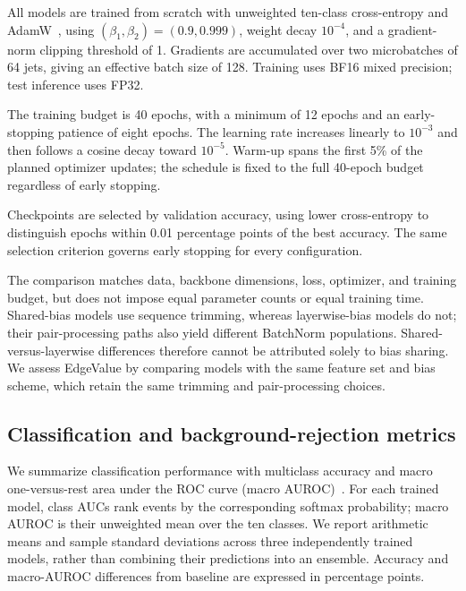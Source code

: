 All models are trained from scratch with unweighted ten-class cross-entropy and
AdamW~\citep{Loshchilov2019AdamW}, using $(\beta_1,\beta_2)=(0.9,0.999)$,
weight decay $10^{-4}$, and a gradient-norm clipping threshold of 1.
Gradients are accumulated over two microbatches of 64 jets, giving an effective
batch size of 128. Training uses BF16 mixed precision; test inference uses FP32.

The training budget is 40 epochs, with a minimum of 12 epochs and an early-stopping
patience of eight epochs. The learning rate increases linearly to $10^{-3}$ and
then follows a cosine decay toward $10^{-5}$. Warm-up spans the first 5\% of
the planned optimizer updates; the schedule is fixed to the full 40-epoch
budget regardless of early stopping.

Checkpoints are selected by validation accuracy, using lower cross-entropy
to distinguish epochs within 0.01 percentage points of the best accuracy.
The same selection criterion governs early stopping for every configuration.

The comparison matches data, backbone dimensions, loss, optimizer, and training
budget, but does not impose equal parameter counts or equal training time.
Shared-bias models use sequence trimming, whereas layerwise-bias models do not;
their pair-processing paths also yield different BatchNorm populations.
Shared-versus-layerwise differences therefore cannot be attributed solely to
bias sharing. We assess EdgeValue by comparing models with the same feature
set and bias scheme, which retain the same trimming and pair-processing choices.

\subsection{Classification and background-rejection metrics}
We summarize classification performance with multiclass accuracy and macro
one-versus-rest area under the ROC curve (macro AUROC)~\citep{Fawcett2006ROC}.
For each trained model, class AUCs rank events by the corresponding softmax
probability; macro AUROC is their unweighted mean over the ten classes.
We report arithmetic means and sample standard deviations across three independently
trained models, rather than combining their predictions into an ensemble.
Accuracy and macro-AUROC differences from baseline are expressed in percentage
points.

